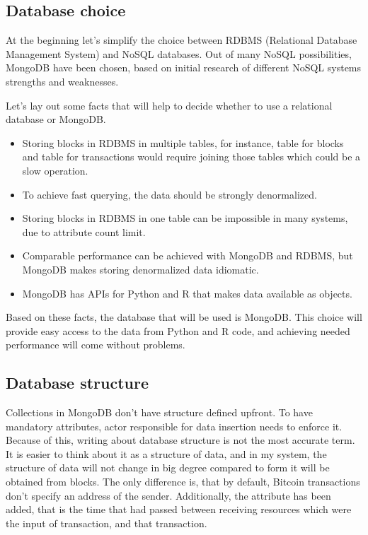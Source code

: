 \documentclass[12pt, en, eng, oneside, final]{mgr}
\begin{document}
\subsection{Database choice}
At the beginning let's simplify the choice between RDBMS (Relational Database Management System) and NoSQL databases. Out of many NoSQL possibilities, MongoDB \cite{mongo} have been chosen, based on initial research of different NoSQL systems strengths and weaknesses.


Let's lay out some facts that will help to decide whether to use a relational database or MongoDB.

\begin{itemize}
\item 
Storing blocks in RDBMS in multiple tables, for instance, table for blocks and table for transactions would require joining those tables which could be a slow operation.
\item 
To achieve fast querying, the data should be strongly denormalized.
\item
Storing blocks in RDBMS in one table can be impossible in many systems, due to attribute count limit.
\item 
Comparable performance can be achieved with MongoDB and RDBMS, but MongoDB makes storing denormalized data idiomatic.
\item
MongoDB has APIs for Python and R that makes data available as objects.
\end{itemize}

Based on these facts, the database that will be used is MongoDB. This choice will provide easy access to the data from Python and R code, and achieving needed performance will come without problems.


\subsection{Database structure}
 
Collections in MongoDB don't have structure defined upfront. To have mandatory attributes, actor responsible for data insertion needs to enforce it. Because of this, writing about database structure is not the most accurate term. It is easier to think about it as a structure of data, and in my system, the structure of data will not change in big degree compared to form it will be obtained from blocks. The only difference is, that by default, Bitcoin transactions don't specify an address of the sender. Additionally, the attribute has been added, that is the time that had passed between receiving resources which were the input of transaction, and that transaction.
\end{document}
